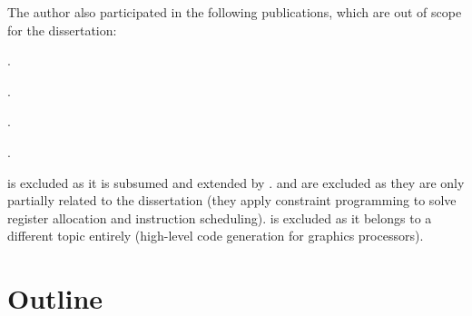 The author also participated in the following publications, which are out of
scope for the dissertation:

\begin{publications}[resume]
  \item {}
    .
  \item {}
    .
  \item {}
    .
  \item {}
    .
\end{publications}
%
 is excluded as it is subsumed and extended by
.  and  are
excluded as they are only partially related to the dissertation (they apply
\gls{constraint programming} to solve \gls{register allocation} and
\gls{instruction scheduling}).  is excluded as it
belongs to a different topic entirely (high-level code generation for graphics
processors).

\section{Outline}

